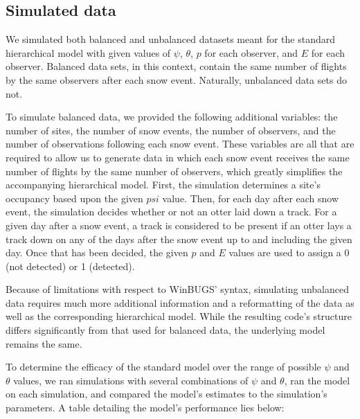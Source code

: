 \documentclass[12pt]{article}
\begin{document}
    \subsection{Simulated data}
    We simulated both balanced and unbalanced datasets meant for the standard
    hierarchical model with given values of \(\psi\), \(\theta\), \(p\) for each
    observer, and \(E\) for each observer.  Balanced data sets, in this context,
    contain the same number of flights by the same observers after each snow
    event.  Naturally, unbalanced data sets do not.

    To simulate balanced data, we provided the following additional variables:
    the number of sites, the number of snow events, the number of observers, and
    the number of observations following each snow event. These variables are
    all that are required to allow us to generate data in which each snow event
    receives the same number of flights by the same number of observers, which
    greatly simplifies the accompanying hierarchical model. First, the
    simulation determines a site's occupancy based upon the given \(psi\) value.
    Then, for each day after each snow event, the simulation decides whether or
    not an otter laid down a track. For a given day after a snow event, a track
    is considered to be present if an otter lays a track down on any of the days
    after the snow event up to and including the given day.  Once that has been
    decided, the given \(p\) and \(E\) values are used to assign a 0 (not
    detected) or 1 (detected).

    Because of limitations with respect to WinBUGS' syntax, simulating
    unbalanced data requires much more additional information and a reformatting
    of the data as well as the corresponding hierarchical model. While the
    resulting code's structure differs significantly from that used for balanced
    data, the underlying model remains the same.

    To determine the efficacy of the standard model over the range of possible
    \(\psi\) and \(\theta\) values, we ran simulations with several combinations
    of \(\psi\) and \(\theta\), ran the model on each simulation, and compared
    the model's estimates to the simulation's parameters. A table detailing the
    model's performance lies below:
\end{document}
